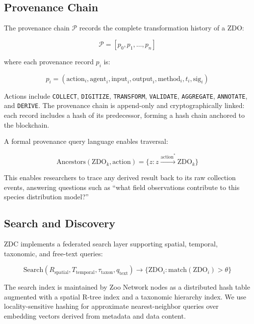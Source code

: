 \documentclass[11pt,a4paper]{article}
\begin{document}
\subsection{Provenance Chain}

The provenance chain $\mathcal{P}$ records the complete transformation history of a ZDO:

\begin{equation}
    \mathcal{P} = [p_0, p_1, \ldots, p_n]
\end{equation}

\noindent where each provenance record $p_i$ is:

\begin{equation}
    p_i = (\text{action}_i, \text{agent}_i, \text{input}_i, \text{output}_i, \text{method}_i, t_i, \text{sig}_i)
\end{equation}

Actions include \texttt{COLLECT}, \texttt{DIGITIZE}, \texttt{TRANSFORM}, \texttt{VALIDATE}, \texttt{AGGREGATE}, \texttt{ANNOTATE}, and \texttt{DERIVE}.
The provenance chain is append-only and cryptographically linked: each record includes a hash of its predecessor, forming a hash chain anchored to the blockchain.

A formal provenance query language enables traversal:

\begin{equation}
    \text{Ancestors}(\text{ZDO}_k, \text{action}) = \{z : z \xrightarrow{\text{action}^*} \text{ZDO}_k\}
\end{equation}

This enables researchers to trace any derived result back to its raw collection events, answering questions such as ``what field observations contribute to this species distribution model?''

\subsection{Search and Discovery}

ZDC implements a federated search layer supporting spatial, temporal, taxonomic, and free-text queries:

\begin{equation}
    \text{Search}(R_{\text{spatial}}, T_{\text{temporal}}, \tau_{\text{taxon}}, q_{\text{text}}) \rightarrow \{\text{ZDO}_i : \text{match}(\text{ZDO}_i) > \theta\}
\end{equation}

The search index is maintained by Zoo Network nodes as a distributed hash table augmented with a spatial R-tree index and a taxonomic hierarchy index.
We use locality-sensitive hashing for approximate nearest-neighbor queries over embedding vectors derived from metadata and data content.
\end{document}
